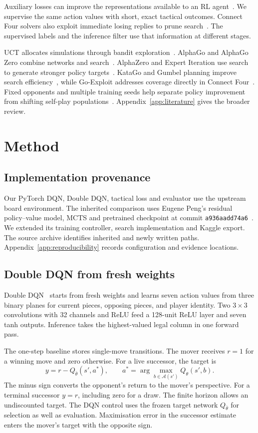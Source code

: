\documentclass[letterpaper]{article}
\begin{document}
Auxiliary losses can improve the representations available to an RL
agent~\cite{jaderberg2016}. We supervise the same action values with
short, exact tactical outcomes. Connect Four solvers also exploit immediate
losing replies to prune search~\cite{pons-tactics}. The supervised labels
and the inference filter use that information at different stages.

UCT allocates simulations through bandit exploration~\cite{kocsis2006}.
AlphaGo and AlphaGo Zero combine networks and search~\cite{silver2016,silver2017zero}.
AlphaZero and Expert Iteration use search to generate stronger policy
targets~\cite{silver2018,anthony2017}. KataGo and Gumbel planning improve
search efficiency~\cite{wu2019,danihelka2022}, while Go-Exploit addresses
coverage directly in Connect Four~\cite{trudeau2023}. Fixed opponents and
multiple training seeds help separate policy improvement from shifting
self-play populations~\cite{lanctot2017,henderson2018,agarwal2021}.
Appendix~\ref{app:literature} gives the broader review.

\section{Method}
\subsection{Implementation provenance}
Our PyTorch DQN, Double DQN, tactical loss and evaluator use the upstream
board environment. The inherited comparison
uses Eugene Peng's residual policy--value model, MCTS and pretrained
checkpoint at commit \texttt{a936aadd74a6}~\cite{peng}. We extended its
training controller, search implementation and Kaggle export. The source
archive identifies inherited and newly written paths. Appendix~\ref{app:reproducibility}
records configuration and evidence locations.

\subsection{Double DQN from fresh weights}
Double DQN~\cite{mnih2015,vanhasselt2016} starts from fresh weights and learns
seven action values from three binary planes for current pieces, opposing pieces,
and player identity. Two $3\times3$
convolutions with 32 channels and ReLU feed a 128-unit ReLU layer and seven
tanh outputs. Inference takes the highest-valued legal column in one forward pass.

The one-step baseline stores single-move transitions. The mover receives $r=1$ for a winning move
and zero otherwise. For a live successor, the target is
\begin{equation}
 y=r-Q_{\bar\theta}(s',a^*),\qquad
 a^*=\arg\max_{b\in\mathcal A(s')} Q_\theta(s',b).
 \label{eq:ddqn}
\end{equation}
The minus sign converts the opponent's return to the mover's perspective.
For a terminal successor $y=r$, including zero for a draw. The finite horizon
allows an undiscounted target. The DQN control uses the frozen target network
$Q_{\bar\theta}$ for selection as well as evaluation. Maximisation error in
the successor estimate enters the mover's target with the opposite sign.
\end{document}
